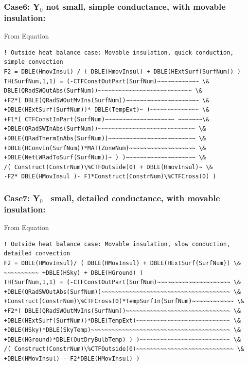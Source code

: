 \subsubsection{\texorpdfstring{Case6: Y\(_{0}\) not small, simple conductance, with movable insulation:}{Case6: Y\_\{0\} not small, simple conductance, with movable insulation:}}\label{case6-yux5f0-not-small-simple-conductance-with-movable-insulation-1}

From Equation

\begin{lstlisting}
! Outside heat balance case: Movable insulation, quick conduction, simple convection
F2 = DBLE(HmovInsul) / ( DBLE(HmovInsul) + DBLE(HExtSurf(SurfNum)) )
TH(SurfNum,1,1) = (-CTFConstOutPart(SurfNum)~~~~~~~~~~~~ \&
DBLE(QRadSWOutAbs(SurfNum))~~~~~~~~~~~~~~~~~~~~~~~~~~~ \&
+F2*( DBLE(QRadSWOutMvIns(SurfNum))~~~~~~~~~~~~~~~~~~~~~ \&
+DBLE(HExtSurf(SurfNum))* DBLE(TempExt)~ )~~~~~~~~~~~~~~ \&
+F1*( CTFConstInPart(SurfNum)~~~~~~~~~~~~~~~~~~~~ ~~~~~~~\&
+DBLE(QRadSWInAbs(SurfNum))~~~~~~~~~~~~~~~~~~~~~~~~~~~~ \&
+DBLE(QRadThermInAbs(SurfNum))~~~~~~~~~~~~~~~~~~~~~~~~~ \&
+DBLE(HConvIn(SurfNum))*MAT(ZoneNum)~~~~~~~~~~~~~~~~~~~ \&
+DBLE(NetLWRadToSurf(SurfNum))~ ) )~~~~~~~~~~~~~~~~~~~~ \&
/( Construct(ConstrNum)\%CTFOutside(0) + DBLE(HmovInsul)~ \&
-F2* DBLE(HMovInsul )- F1*Construct(ConstrNum)\%CTFCross(0) )
\end{lstlisting}

\subsubsection{\texorpdfstring{Case7: Y\(_{0}\)~ small, detailed conductance, with movable insulation:}{Case7: Y\_\{0\}~ small, detailed conductance, with movable insulation:}}\label{case7-yux5f0-small-detailed-conductance-with-movable-insulation-1}

From Equation

\begin{lstlisting}
! Outside heat balance case: Movable insulation, slow conduction, detailed convection
F2 = DBLE(HMovInsul)/ ( DBLE(HMovInsul) + DBLE(HExtSurf(SurfNum)) \&
~~~~~~~~~~ +DBLE(HSky) + DBLE(HGround) )
TH(SurfNum,1,1) = (-CTFConstOutPart(SurfNum)~~~~~~~~~~~~~~~~~~~~~ \&
+DBLE(QRadSWOutAbs(SurfNum))~~~~~~~~~~~~~~~~~~~~~~~~~~~~~~~~~~~~~ \&
+Construct(ConstrNum)\%CTFCross(0)*TempSurfIn(SurfNum)~~~~~~~~~~~~ \&
+F2*( DBLE(QRadSWOutMvIns(SurfNum))~~~~~~~~~~~~~~~~~~~~~~~~~~~~~~ \&
+DBLE(HExtSurf(SurfNum))*DBLE(TempExt)~~~~~~~~~~~~~~~~~~~~~~~~~~~ \&
+DBLE(HSky)*DBLE(SkyTemp)~~~~~~~~~~~~~~~~~~~~~~~~~~~~~~~~~~~~~~~~ \&
+DBLE(HGround)*DBLE(OutDryBulbTemp) ) )~~~~~~~~~~~~~~~~~~~~~~~~~~ \&
/( Construct(ConstrNum)\%CTFOutside(0)~~~~~~~~~~~~~~~~~~~~~~~~~~~~ \&
+DBLE(HMovInsul) - F2*DBLE(HMovInsul) )
\end{lstlisting}

